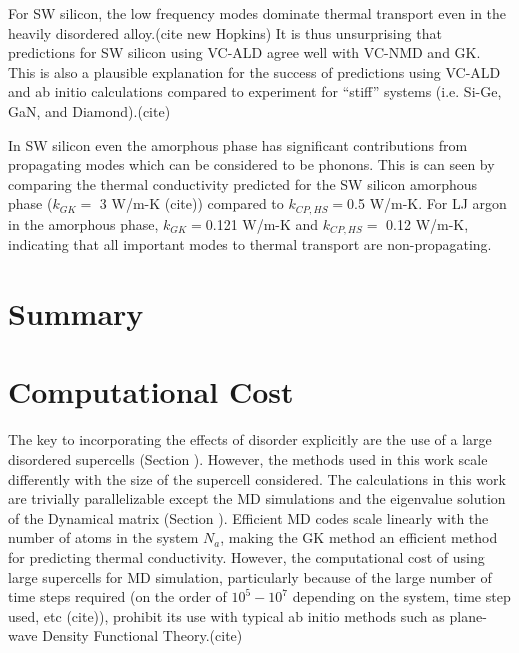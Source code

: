 \documentclass[aps,prb,twocolumn,superscriptaddress,amsmath,amssymb,floatfix]{revtex4}
\begin{document}
For SW silicon, the low frequency modes dominate thermal transport 
even in the heavily disordered alloy.(cite new Hopkins) 
It is thus unsurprising that predictions for 
SW silicon using VC-ALD agree well with VC-NMD and GK. This is also a 
plausible explanation for the success of predictions using 
VC-ALD and ab initio calculations compared to experiment for 
``stiff'' systems (i.e. Si-Ge, GaN, and Diamond).(cite)

In SW silicon even the amorphous phase has significant contributions 
from propagating modes which can be considered to be phonons. This is 
can seen by comparing the thermal conductivity predicted for the 
SW silicon amorphous phase ($k_{GK} =$ 3 W/m-K (cite)) compared to 
$k_{CP,HS} = $0.5 W/m-K.  For LJ argon in the amorphous phase, 
$k_{GK} = $0.121 W/m-K and $k_{CP,HS} =$ 0.12 W/m-K, indicating that 
all important modes to thermal transport are non-propagating.

\section{\label{S:}Summary}



\appendix

\section{\label{A:Computational Cost}
Computational Cost}

The key to incorporating the effects of disorder explicitly are the use 
of a large disordered supercells (Section ).  However, the methods used 
in this work scale differently with the size of the supercell considered. 
The calculations in this work are trivially parallelizable\cite{} 
except the 
MD simulations\cite{plimpton_fast_1995} and the eigenvalue solution of the 
Dynamical matrix (Section ).\cite{gale_general_2003} Efficient MD 
codes scale linearly with the number of atoms in the system $N_a$, making 
the GK method an efficient method for predicting thermal conductivity. 
However, the computational cost of using large supercells for MD simulation, 
particularly because of the large number of time steps required 
(on the order of $10^5 - 10^7$ depending on the 
system, time step used, etc (cite)), prohibit its use with typical 
ab initio methods such as plane-wave Density Functional Theory.(cite) 
\end{document}
